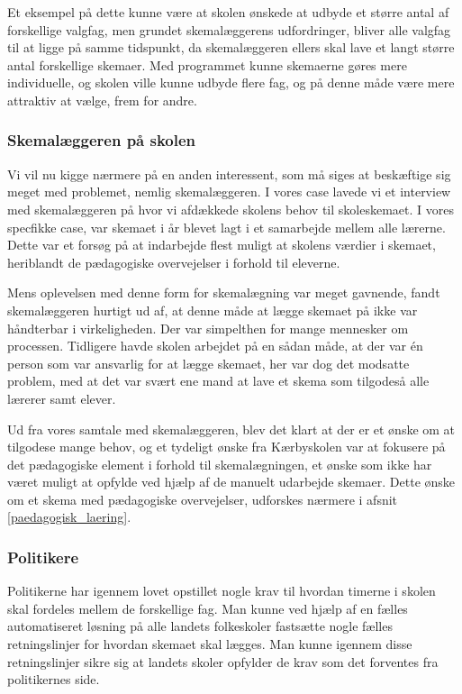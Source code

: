 Et eksempel på dette kunne være at skolen ønskede at udbyde et større antal af forskellige valgfag, men grundet skemalæggerens udfordringer, bliver alle valgfag til at ligge på samme tidspunkt, da skemalæggeren ellers skal lave et langt større antal forskellige skemaer. Med programmet kunne skemaerne gøres mere individuelle, og skolen ville kunne udbyde flere fag, og på denne måde være mere attraktiv at vælge, frem for andre.

\subsubsection{Skemalæggeren på skolen}
Vi vil nu kigge nærmere på en anden interessent, som må siges at beskæftige sig meget med problemet, nemlig skemalæggeren. I vores case lavede vi et interview med skemalæggeren på \school hvor vi afdækkede skolens behov til skoleskemaet. I vores specfikke case, var skemaet i år blevet lagt i et samarbejde mellem alle lærerne. Dette var et forsøg på at indarbejde flest muligt at skolens værdier i skemaet, heriblandt de pædagogiske overvejelser i forhold til eleverne.

Mens oplevelsen med denne form for skemalægning var meget gavnende, fandt skemalæggeren hurtigt ud af, at denne måde at lægge skemaet på ikke var håndterbar i virkeligheden. Der var simpelthen for mange mennesker om processen. Tidligere havde skolen arbejdet på en sådan måde, at der var \'en person som var ansvarlig for at lægge skemaet, her var dog det modsatte problem, med at det var svært ene mand at lave et skema som tilgodeså alle lærerer samt elever.

Ud fra vores samtale med skemalæggeren, blev det klart at der er et ønske om at tilgodese mange behov, og et tydeligt ønske fra Kærbyskolen var at fokusere på det pædagogiske element i forhold til skemalægningen, et ønske som ikke har været muligt at opfylde ved hjælp af de manuelt udarbejde skemaer. Dette ønske om et skema med pædagogiske overvejelser, udforskes nærmere i afsnit \ref{paedagogisk_laering}.



\subsubsection{Politikere}
Politikerne har igennem lovet opstillet nogle krav til hvordan timerne i skolen skal fordeles mellem de forskellige fag. Man kunne ved hjælp af en fælles automatiseret løsning på alle landets folkeskoler fastsætte nogle fælles retningslinjer for hvordan skemaet skal lægges. Man kunne igennem disse retningslinjer sikre sig at landets skoler opfylder de krav som det forventes fra politikernes side. 

